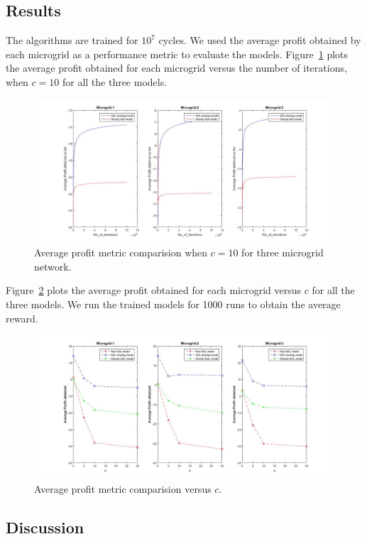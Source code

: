 \subsection{Results}
The algorithms are trained for $10^7$ cycles. We used the average profit obtained by each microgrid as a performance metric to evaluate the models. Figure~\ref{r2} plots the average profit obtained for each microgrid versus the number of iterations, when $c = 10$ for all the three models. 
\begin{figure}[thbp]
	\centering
	\includegraphics[scale = 0.2]{second_plot.jpg}
	\caption{Average profit metric comparision when $c = 10$ for three microgrid network.}
        \label{r2}
\end{figure}

Figure~\ref{r1} plots the average profit obtained for each microgrid versus $c$ for all the three models. We run the trained models for 1000 runs to obtain the average reward. 
\begin{figure}[thbp]
	\centering
	\includegraphics[scale = 0.2]{first_plot.jpg}
	\caption{Average profit metric comparision versus $c$.}
	 \label{r1}
\end{figure}
\subsection{Discussion}

